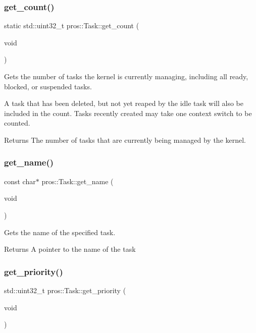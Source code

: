 \subsubsection{\texorpdfstring{get\+\_\+count()}{get\_count()}}
{\footnotesize\ttfamily static std\+::uint32\+\_\+t pros\+::\+Task\+::get\+\_\+count (\begin{DoxyParamCaption}\item[{void}]{ }\end{DoxyParamCaption})\hspace{0.3cm}{\ttfamily [static]}}



Gets the number of tasks the kernel is currently managing, including all ready, blocked, or suspended tasks. 

A task that has been deleted, but not yet reaped by the idle task will also be included in the count. Tasks recently created may take one context switch to be counted.

\begin{DoxyReturn}{Returns}
The number of tasks that are currently being managed by the kernel. 
\end{DoxyReturn}
\mbox{\label{classpros_1_1Task_a3c559d11cf602b99fc870b8be43fe191}} 
\subsubsection{\texorpdfstring{get\+\_\+name()}{get\_name()}}
{\footnotesize\ttfamily const char$\ast$ pros\+::\+Task\+::get\+\_\+name (\begin{DoxyParamCaption}\item[{void}]{ }\end{DoxyParamCaption})}



Gets the name of the specified task. 

\begin{DoxyReturn}{Returns}
A pointer to the name of the task 
\end{DoxyReturn}
\mbox{\label{classpros_1_1Task_a97e11478bd99181a664ed6e975fdb248}} 
\subsubsection{\texorpdfstring{get\+\_\+priority()}{get\_priority()}}
{\footnotesize\ttfamily std\+::uint32\+\_\+t pros\+::\+Task\+::get\+\_\+priority (\begin{DoxyParamCaption}\item[{void}]{ }\end{DoxyParamCaption})}



